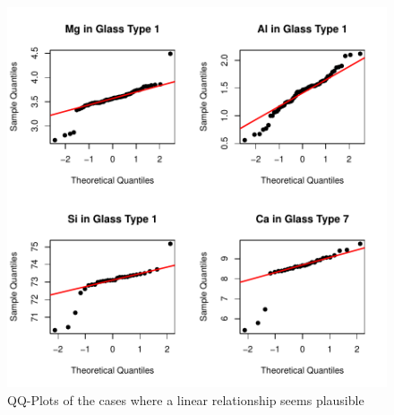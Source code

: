 \documentclass[a4paper, 12pt, titlepage, headsepline, listof = totoc, bibliography = totoc, numbers = noenddot]{scrartcl}
\begin{document}
\begin{figure}[h!]
\centering
\includegraphics[width=\textwidth]{report-QQsampleslin1}
\caption{QQ-Plots of the cases where a linear relationship seems plausible}
\label{fig:QQsampleslin1}
\end{figure}


\end{document}
